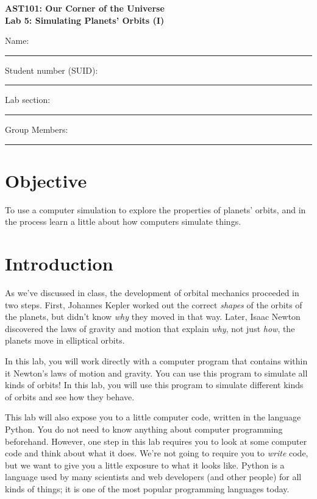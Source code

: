\documentclass[11pt]{article}
\begin{document}
\begin{center}
\textbf{\Large
AST101: Our Corner of the Universe \\
\vspace*{0.1cm}
Lab 5: Simulating Planets' Orbits (I)
}
\end{center}

\vspace*{0.5cm}

{\Large Name:}\vspace*{0.5cm}\\\hrule
{\Large Student number (SUID):}\vspace*{0.5cm}\\\hrule
{\Large Lab section:}\vspace*{0.5cm}\\\hrule
{\Large Group Members:}\vspace*{0.5cm}\\\hrule
\vspace*{0.5cm}


\section{Objective}

To use a computer simulation to explore the properties of planets' orbits, and in the process learn a little about how computers simulate things.

\section{Introduction}

As we've discussed in class, the development of orbital mechanics proceeded in two steps. First, Johannes Kepler worked out the correct {\it shapes} of the orbits of the planets, but didn't know {\it why} they moved in that way. Later, Isaac Newton discovered the laws of gravity and motion that explain {\it why}, not just {\it how}, the planets move in elliptical orbits.

In this lab, you will work directly with a computer program that contains within it Newton's laws of motion and gravity. You can use this program to simulate all kinds of orbits! In this lab, you will use this program to simulate different kinds of orbits and see how they behave.

This lab will also expose you to a little computer code, written in the language Python. You do not need to know anything about computer programming beforehand. However, one step in this lab requires you to look at some computer code and think about what it does. We're not going to require you to {\it write} code, but we want to give you a little exposure to what it looks like. Python is a language used by many scientists and web developers (and other people) for all kinds of things; it is one of the most popular programming languages today.
\end{document}
